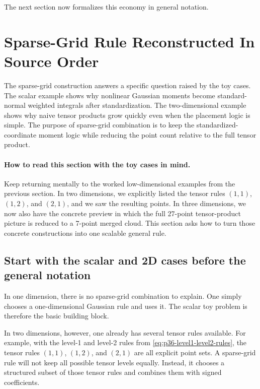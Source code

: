 \documentclass[11pt]{article}
\numberwithin{equation}{section}
\begin{document}
The next section now formalizes this economy in general notation.

\section{Sparse-Grid Rule Reconstructed In Source Order}
\label{sec:p31-sgq-reconstruction}

The sparse-grid construction answers a specific question raised by the toy cases.
The scalar example shows why nonlinear Gaussian moments become standard-normal
weighted integrals after standardization.  The two-dimensional example shows why
naive tensor products grow quickly even when the placement logic is simple.  The
purpose of sparse-grid combination is to keep the standardized-coordinate moment
logic while reducing the point count relative to the full tensor product.

\paragraph{How to read this section with the toy cases in mind.}
Keep returning mentally to the worked low-dimensional examples from the previous
section.  In two dimensions, we explicitly listed the tensor rules
\((1,1)\), \((1,2)\), and \((2,1)\), and we saw the resulting points.  In three
dimensions, we now also have the concrete preview in which the full 27-point
tensor-product picture is reduced to a 7-point merged cloud.  This section asks
how to turn those concrete constructions into one scalable general rule.

\subsection{Start with the scalar and 2D cases before the general notation}

In one dimension, there is no sparse-grid combination to explain.  One simply
chooses a one-dimensional Gaussian rule and uses it.  The scalar toy problem is
therefore the basic building block.

In two dimensions, however, one already has several tensor rules available.  For
example, with the level-1 and level-2 rules from
\eqref{eq:p36-level1-level2-rules}, the tensor rules \((1,1)\), \((1,2)\), and
\((2,1)\) are all explicit point sets.  A sparse-grid rule will not keep all
possible tensor levels equally.  Instead, it chooses a structured subset of
those tensor rules and combines them with signed coefficients.
\end{document}
